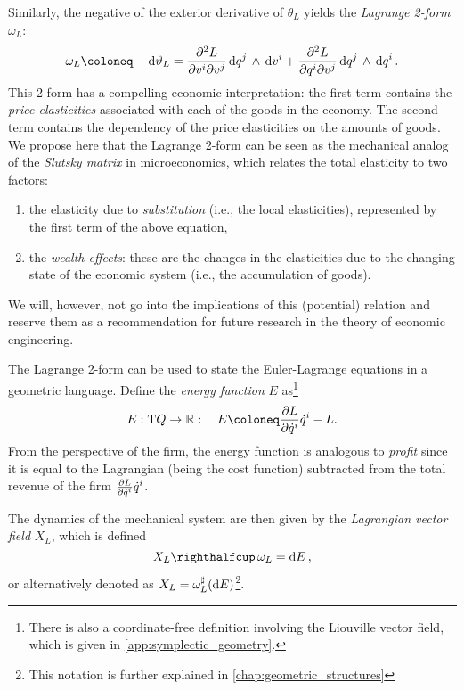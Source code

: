 Similarly, the negative of the exterior derivative of \(\theta_L\) yields the \emph{Lagrange 2-form} \(\omega_L\):
\begin{equation}
    \omega_L \coloneq -\dd{\theta_L} = \pdv[2]{L}{v^i}{v^j}\wedgep{\dd{q^j}}{\dd{v^i}} + \pdv[2]{L}{q^i}{v^j}\wedgep{\dd{q^j}}{\dd{q^i}}.
\end{equation}
This 2-form has a compelling economic interpretation: the first term contains the \emph{price elasticities} associated with each of the goods in the economy. The second term contains the dependency of the price elasticities on the amounts of goods.
We propose here that the Lagrange 2-form can be seen as the mechanical analog of the \emph{Slutsky matrix} in microeconomics, which relates the total elasticity to two factors: \cite{varianhalr1992}
\begin{enumerate}[label=(\roman*), noitemsep]
    \item the elasticity due to \emph{substitution} (i.e., the local elasticities), represented by the first term of the above equation, 
    \item the \emph{wealth effects}: these are the changes in the elasticities due to the changing state of the economic system (i.e., the accumulation of goods).
\end{enumerate}
We will, however, not go into the implications of this (potential) relation and reserve them as a recommendation for future research in the theory of economic engineering.

The Lagrange 2-form can be used to state the Euler-Lagrange equations in a geometric language. Define the \emph{energy function} \(E\) as\footnote{There is also a coordinate-free definition involving the Liouville vector field, which is given in \cref{app:symplectic_geometry}.}
\begin{equation}
    E: \tbundle{Q} \to \real: \quad E \coloneq \pdv{L}{\dot{q}^i}\dot{q}^i - L.
\end{equation}
From the perspective of the firm, the energy function is analogous to \emph{profit} since it is equal to the Lagrangian (being the cost function) subtracted from the total revenue of the firm \(\pdv{L}{\dot{q}^i}\dot{q}^i\).
    
The dynamics of the mechanical system are then given by the \emph{Lagrangian vector field} \(X_L\), which is defined 
\begin{equation}
    \intpr{X_L}{\omega_L} = \dd{E}, 
\end{equation}
or alternatively denoted as \(X_L = \omega_L^\sharp(\dd{E})\)\footnote{This notation is further explained in \cref{chap:geometric_structures}}.


